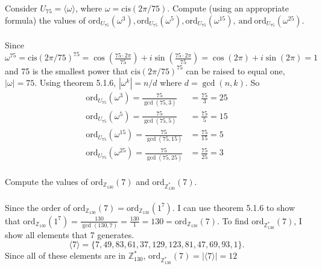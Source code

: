 \documentclass[titlepage]{article}
\newenvironment{problem}[2][Problem]{\begin{trivlist}
\item[\hskip \labelsep {\bfseries #1}\hskip \labelsep {\bfseries #2.}]}{\end{trivlist}}
\begin{document}
\begin{problem}{8}
Consider $U_{75} = \langle \omega \rangle$, where $\omega = \text{cis}(2\pi/75)$. Compute (using an appropriate formula) the values of $\text{ord}_{U_{75}}(\omega^3), \text{ord}_{U_{75}}(\omega^5), \text{ord}_{U_{75}}(\omega^{15}), \ \text{and} \ \text{ord}_{U_{75}}(\omega^{25})$.
\\ \\ 
Since $\omega^{75} = \text{cis}(2\pi/75)^{75} = \cos(\frac{75\cdot2\pi}{75}) + i\sin(\frac{75\cdot2\pi}{75}) = \cos(2\pi) + i\sin(2\pi)=1$ and 75 is the smallest power that $\text{cis}(2\pi/75)^{75}$ can be raised to equal one, $|\omega| = 75 $. Using theorem 5.1.6,  $|\omega^k| = n/d $ where $d=\gcd(n,k)$. So
\begin{align*}
\text{ord}_{U_{75}}(\omega^3) = \frac{75}{\gcd(75,3)} &= \frac{75}{3} = 25\\
\text{ord}_{U_{75}}(\omega^5) = \frac{75}{\gcd(75,5)} &= \frac{75}{5} = 15\\
\text{ord}_{U_{75}}(\omega^{15})= \frac{75}{\gcd(75,15)} &= \frac{75}{15} = 5\\
\text{ord}_{U_{75}}(\omega^{25}) = \frac{75}{\gcd(75,25)} &= \frac{75}{25} = 3\\
\end{align*}
\end{problem}
\begin{problem}{9}
Compute the values of $\text{ord}_{\mathbb{Z}_{130}}(7)$ and $\text{ord}_{\mathbb{Z}^*_{130}}(7)$.
 \\ \\
 Since the order of $\text{ord}_{\mathbb{Z}_{130}}(7) = \text{ord}_{\mathbb{Z}_{130}}(1^7)$. I can use theorem 5.1.6 to show that $ \text{ord}_{\mathbb{Z}_{130}}(1^7) = \frac{130}{\gcd(130,7)} = \frac{130}{1} = 130 = \text{ord}_{\mathbb{Z}_{130}}(7)$. To find $\text{ord}_{\mathbb{Z}^*_{130}}(7)$, I show all elements that 7 generates.
 $$\langle7 \rangle = \{7, 49, 83, 61, 37, 129, 123, 81, 47, 69, 93, 1\}.$$
 Since all of these elements are in $\mathbb{Z}^*_{130}$, $\text{ord}_{\mathbb{Z}^*_{130}}(7) = |\langle 7 \rangle| = 12$ 
\end{problem}
\end{document}
